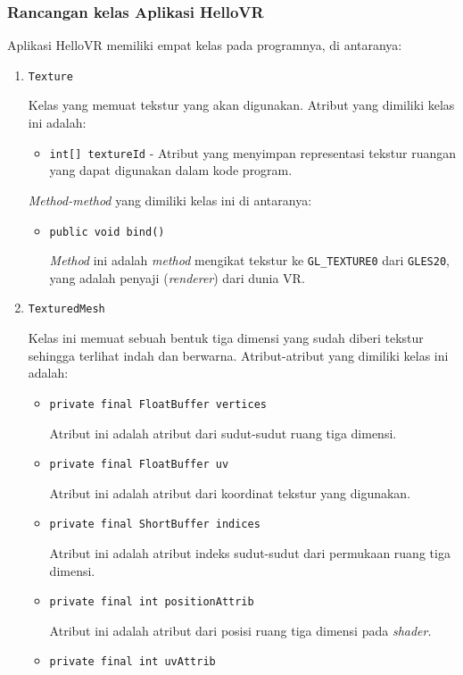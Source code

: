 \subsubsection{Rancangan kelas Aplikasi HelloVR}
Aplikasi HelloVR memiliki empat kelas pada programnya, di antaranya: 
\begin{enumerate}
	\item \texttt{Texture}
	
	Kelas yang memuat tekstur yang akan digunakan. Atribut yang dimiliki kelas ini adalah:
		\begin{itemize}
			\item \texttt{int[] textureId} - Atribut yang menyimpan representasi tekstur ruangan yang dapat digunakan dalam kode program. 
		\end{itemize}			
		\textit{Method-method} yang dimiliki kelas ini di antaranya:
		\begin{itemize}
			\item \texttt{public void bind()}
			
			\textit{Method} ini adalah \textit{method} mengikat tekstur ke \texttt{GL\_TEXTURE0} dari \texttt{GLES20}, yang adalah penyaji (\textit{renderer}) dari dunia VR.
		\end{itemize}		 
	\item \texttt{TexturedMesh}
	
	Kelas ini memuat sebuah bentuk tiga dimensi yang sudah diberi tekstur sehingga terlihat indah dan berwarna. Atribut-atribut yang dimiliki kelas ini adalah:
		\begin{itemize}
			\item \texttt{private final FloatBuffer vertices}
			
			Atribut ini adalah atribut dari sudut-sudut ruang tiga dimensi.
  			\item \texttt{private final FloatBuffer uv}
  			
  			Atribut ini adalah atribut dari koordinat tekstur yang digunakan.
  			\item \texttt{private final ShortBuffer indices}
  			
  			Atribut ini adalah atribut indeks sudut-sudut dari permukaan ruang tiga dimensi.
  			\item \texttt{private final int positionAttrib}
  			
  			Atribut ini adalah atribut dari posisi ruang tiga dimensi pada \textit{shader}.
  			\item \texttt{private final int uvAttrib}
  			

\end{itemize}
\end{enumerate}
